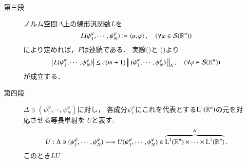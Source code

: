 \begin{prf}
\begin{description}
			\item[第三段]
				ノルム空間$\Delta$上の線形汎関数$L$を
				\begin{align}
					L(\psi^\varphi_1,\cdots,\psi^\varphi_N)
					\coloneqq \inprod<u,\varphi>,
					\quad (\forall \varphi \in \rapid{\R^n})
				\end{align}
				により定めれば，$F$は連続である．
				実際()と
				()より
				\begin{align}
					\left| L(\psi^\varphi_1,\cdots,\psi^\varphi_N) \right|
					\leq c (m+1) \left\|\, (\psi^\varphi_1,\cdots,\psi^\varphi_N)\, \right\|_{\Delta},
					\quad (\forall \varphi \in \mathcal{S}(\mathbb{R}^n))
				\end{align}
				が成立する．
				
			\item[第四段]
				$\Delta \ni (\psi^\varphi_1,\cdots,\psi^\varphi_N)$に対し，
				各成分$\psi^\varphi_i$にこれを代表とする$\mathrm{L}^1(\mathbb{R}^n)$の元を対応させる等長単射を
				$U$と表す:
				\begin{align}
					U:\Delta \ni (\psi^\varphi_1,\cdots,\psi^\varphi_N) \longmapsto 
					U (\psi^\varphi_1,\cdots,\psi^\varphi_N) \in
					\overbrace{\mathrm{L}^1(\mathbb{R}^n) \times \cdots \times \mathrm{L}^1(\mathbb{R}^n)}^N.
				\end{align}
				このとき$LU$
		\end{description}
	\end{prf}